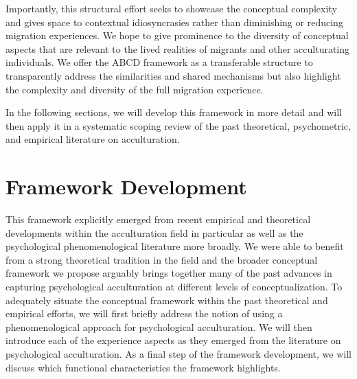 \documentclass[man, 12pt, a4paper, mask]{apa7}
\begin{document}
Importantly, this structural effort seeks to showcase the conceptual complexity and gives space to contextual idiosyncrasies rather than diminishing or reducing migration experiences. We hope to give prominence to the diversity of conceptual aspects that are relevant to the lived realities of migrants and other acculturating individuals. We offer the ABCD framework as a transferable structure to transparently address the similarities and shared mechanisms but also highlight the complexity and diversity of the full migration experience.

In the following sections, we will develop this framework in more detail and will then apply it in a systematic scoping review of the past theoretical, psychometric, and empirical literature on acculturation.



\section{Framework Development} 
This framework explicitly emerged from recent empirical and theoretical developments within the acculturation field in particular as well as the psychological phenomenological literature more broadly. We were able to benefit from a strong theoretical tradition in the field and the broader conceptual framework we propose arguably brings together many of the past advances in capturing psychological acculturation at different levels of conceptualization. To adequately situate the conceptual framework within the past theoretical and empirical efforts, we will first briefly address the notion of using a phenomenological approach for psychological acculturation. We will then introduce each of the experience aspects as they emerged from the literature on psychological acculturation. As a final step of the framework development, we will discuss which functional characteristics the framework highlights.
\end{document}

